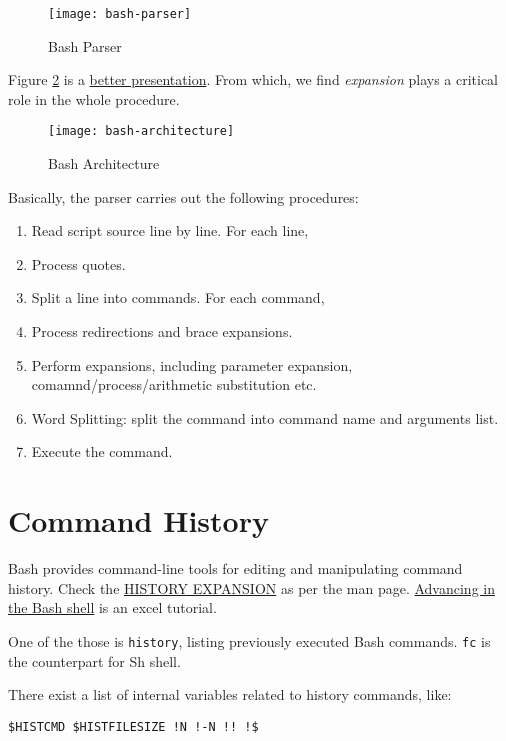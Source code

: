 \begin{figure}[!htb]
  \centering
  \texttt{[image: bash-parser]}
  \caption{Bash Parser}
  \label{fig:bash-parser}
\end{figure}

Figure \ref{fig:bash-architecture} is a
\href{http://aosabook.org/en/bash.html}{better presentation}. From
which, we find \textit{expansion} plays a critical role in the
whole procedure.

\begin{figure}
  \centering
  \texttt{[image: bash-architecture]}
  \caption{Bash Architecture}
  \label{fig:bash-architecture}
\end{figure}

Basically, the parser carries out the following procedures:

\begin{enumerate}
\item Read script source line by line. For each line, 
\item Process quotes.
\item Split a line into commands. For each command,
\item Process redirections and brace expansions.
\item Perform expansions, including parameter expansion,
  comamnd/process/arithmetic substitution etc.
\item Word Splitting: split the command into command name and arguments list.
\item Execute the command.
\end{enumerate}

\section{Command History}
\label{sec:command-history}

Bash provides command-line tools for editing and manipulating
command history. Check the \uline{HISTORY EXPANSION} as per the
man
page. \href{https://samrowe.com/wordpress/advancing-in-the-bash-shell/}{Advancing
  in the Bash shell} is an excel tutorial.

One of the those is \lstinline|history|, listing previously
executed Bash commands. \lstinline|fc| is the counterpart for Sh
shell.

There exist a list of internal variables related to history
commands, like:

\begin{lstlisting}
$HISTCMD $HISTFILESIZE !N !-N !! !$ 
\end{lstlisting}

